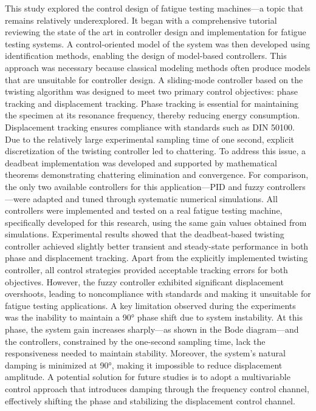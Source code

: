 \documentclass[preprint,12pt]{elsarticle}
\begin{document}
This study explored the control design of fatigue testing machines—a topic that remains relatively underexplored. It began with a comprehensive tutorial reviewing the state of the art in controller design and implementation for fatigue testing systems. A control-oriented model of the system was then developed using identification methods, enabling the design of model-based controllers. This approach was necessary because classical modeling methods often produce models that are unsuitable for controller design.
A sliding-mode controller based on the twisting algorithm was designed to meet two primary control objectives: phase tracking and displacement tracking. Phase tracking is essential for maintaining the specimen at its resonance frequency, thereby reducing energy consumption. Displacement tracking ensures compliance with standards such as DIN 50100. Due to the relatively large experimental sampling time of one second, explicit discretization of the twisting controller led to chattering. To address this issue, a deadbeat implementation was developed and supported by mathematical theorems demonstrating chattering elimination and convergence. For comparison, the only two available controllers for this application—PID and fuzzy controllers—were adapted and tuned through systematic numerical simulations.
All controllers were implemented and tested on a real fatigue testing machine, specifically developed for this research, using the same gain values obtained from simulations. Experimental results showed that the deadbeat-based twisting controller achieved slightly better transient and steady-state performance in both phase and displacement tracking. Apart from the explicitly implemented twisting controller, all control strategies provided acceptable tracking errors for both objectives. However, the fuzzy controller exhibited significant displacement overshoots, leading to noncompliance with standards and making it unsuitable for fatigue testing applications.
A key limitation observed during the experiments was the inability to maintain a 90° phase shift due to system instability. At this phase, the system gain increases sharply—as shown in the Bode diagram—and the controllers, constrained by the one-second sampling time, lack the responsiveness needed to maintain stability. Moreover, the system’s natural damping is minimized at 90°, making it impossible to reduce displacement amplitude. A potential solution for future studies is to adopt a multivariable control approach that introduces damping through the frequency control channel, effectively shifting the phase and stabilizing the displacement control channel.
\end{document}
